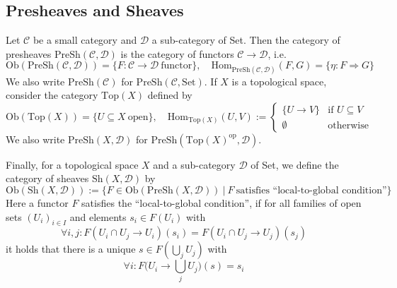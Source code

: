 
\subsection{Presheaves and Sheaves}
Let $\mathcal{C}$ be a small category and $\mathcal{D}$ a sub-category of Set.
Then the category of presheaves $\mathrm{PreSh}(\mathcal{C}, \mathcal{D})$ is the category of functors $\mathcal{C} \to \mathcal{D}$, i.e.
\begin{equation*}
    \mathrm{Ob}(\mathrm{PreSh}(\mathcal{C}, \mathcal{D})) = \{ F: \mathcal{C} \to \mathcal{D} \ \text{functor} \}, \quad \mathrm{Hom}_{\mathrm{PreSh}(\mathcal{C}, \mathcal{D})}(F, G) = \{ \eta: F \Rightarrow G \}
\end{equation*}
We also write $\mathrm{PreSh}(\mathcal{C})$ for $\mathrm{PreSh}(\mathcal{C}, \mathrm{Set})$.
If $X$ is a topological space, consider the category $\mathrm{Top}(X)$ defined by
\begin{equation*}
    \mathrm{Ob}(\mathrm{Top}(X)) = \{ U \subseteq X \ \text{open} \}, \quad \mathrm{Hom}_{\mathrm{Top}(X)}(U, V) := \begin{cases}
        \{ U \to V \} & \text{if $U \subseteq V$} \\
        \emptyset & \text{otherwise}
    \end{cases}
\end{equation*}
We also write $\mathrm{PreSh}(X, \mathcal{D})$ for $\mathrm{PreSh}(\mathrm{Top}(X)^{\mathrm{op}}, \mathcal{D})$.

Finally, for a topological space $X$ and a sub-category $\mathcal{D}$ of Set, we define the category of sheaves $\mathrm{Sh}(X, \mathcal{D})$ by
\begin{equation*}
    \mathrm{Ob}(\mathrm{Sh}(X, \mathcal{D})) := \{ F \in \mathrm{Ob}(\mathrm{PreSh}(X, \mathcal{D})) \ | \ F \ \text{satisfies ``local-to-global condition''} \}
\end{equation*}
Here a functor $F$ satisfies the ``local-to-global condition'', if for all families of open sets $(U_i)_{i \in I}$ and elements $s_i \in F(U_i)$ with
\begin{equation*}
    \forall i, j: F(U_i \cap U_j \to U_i)(s_i) = F(U_i \cap U_j \to U_j)(s_j)
\end{equation*}
it holds that there is a unique $s \in F(\bigcup_j U_j)$ with
\begin{equation*}
    \forall i: F\biggl(U_i \to \bigcup_j U_j\biggr)(s) = s_i
\end{equation*}

